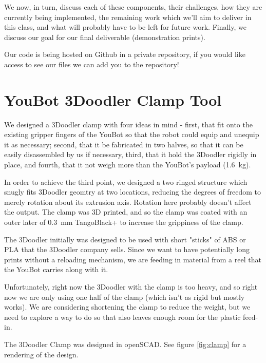 \documentclass[conference]{acmsiggraph}
\begin{document}
We now, in turn, discuss each of these components, their challenges, how they are currently being implemented, the remaining work which we'll aim to deliver in this class, and what will probably have to be left for future work.  Finally, we discuss our goal for our final deliverable (demonstration prints).

Our code is being hosted on Github in a private repository, if you would like access to see our files we can add you to the repository!



\section{YouBot 3Doodler Clamp Tool}
We designed a 3Doodler clamp with four ideas in mind - first, that fit onto the existing gripper fingers of the YouBot so that the robot could equip and unequip it as necessary; second, that it be fabricated in two halves, so that it can be easily disassembled by us if necessary, third, that it hold the 3Doodler rigidly in place, and fourth, that it not weigh more than the YouBot's payload (1.6~kg).

In order to achieve the third point, we designed a two ringed structure which snugly fits 3Doodler geomtry at two locations, reducing the degrees of freedom to merely rotation about its extrusion axis.  Rotation here probably doesn't affect the output.  The clamp was 3D printed, and so the clamp was coated with an outer later of 0.3~mm TangoBlack+ to increase the grippiness of the clamp.

The 3Doodler initially was designed to be used with short "sticks" of ABS or PLA that the 3Doodler company sells.  Since we want to have potentially long prints without a reloading mechanism, we are feeding in material from a reel that the YouBot carries along with it.

Unfortunately, right now the 3Doodler with the clamp is too heavy, and so right now we are only using one half of the clamp (which isn't as rigid but mostly works).  We are considering shortening the clamp to reduce the weight, but we need to explore a way to do so that also leaves enough room for the plastic feed-in.

The 3Doodler Clamp was designed in openSCAD.  See figure \ref{fig:clamp} for a rendering of the design.
\end{document}
